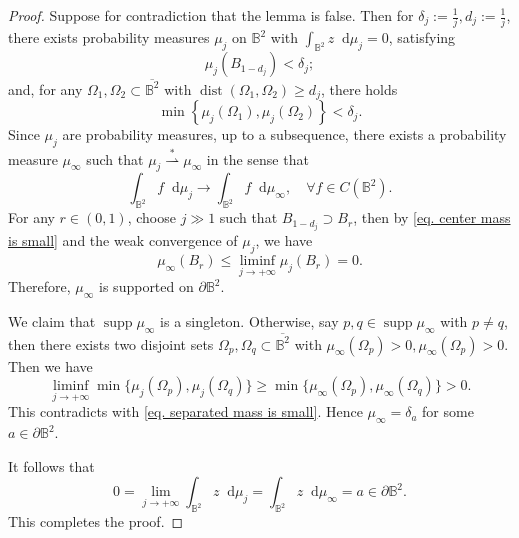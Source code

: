\documentclass[11pt,a4paper,twoside]{amsart}
\newtheorem{sketch proof}{Sketch of the proof}[section]
\newcommand{\dd}{\mathop{}\!\mathrm{d}}
\begin{document}
    \begin{proof}
        Suppose for contradiction that the lemma is false. Then for $\delta_j:=\frac{1}{j}, d_j:=\frac{1}{j}$, there exists probability measures $\mu_j$ on $\mathbb{B}^2$ with $\int_{\mathbb{B}^2}z\dd \mu_j=0$,  satisfying
        \begin{equation}\label{eq. center mass is small}
            \mu_j(B_{1-d_j})
        <\delta_j;
        \end{equation}
        and, for any $\Omega_1,\Omega_2\subset\overline{\mathbb{B}^2}$ with $\operatorname{dist}(\Omega_1,\Omega_2)\geq d_j$, there holds
        \begin{equation}\label{eq. separated mass is small}
            \min\left\{
            \mu_j(\Omega_1),\mu_j(\Omega_2)
        \right\}<\delta_j.
        \end{equation}
        Since $\mu_j$ are probability measures, up to a subsequence, there exists a probability measure $\mu_\infty$ such that $\mu_j\overset{*}{\rightharpoonup}\mu_\infty$ in the sense that
        \[
        \int_{\mathbb{B}^2}f\dd \mu_j
        \to 
        \int_{\mathbb{B}^2}f\dd \mu_\infty,\quad 
        \forall f\in C(\mathbb{B}^2).
        \]
        For any $r\in(0,1)$, choose $j\gg 1$ such that $B_{1-d_j}\supset B_r$, then by \cref{eq. center mass is small} and the weak convergence of $\mu_j$, we have
        \[
        \mu_\infty(B_r)
        \leq\liminf_{j\to+\infty}
        \mu_j(B_r)=0.
        \]
        Therefore, $\mu_\infty$ is supported on $\partial\mathbb{B}^2$. 

        We claim that $\operatorname{supp}\mu_\infty$ is a singleton. Otherwise, say $p,q\in\operatorname{supp}\mu_\infty$ with $p\not=q$, then there exists two disjoint sets $\Omega_p,\Omega_q\subset\overline{\mathbb{B}^2}$ with $\mu_\infty(\Omega_p)>0,\mu_\infty(\Omega_p)>0$. Then we have
        \[
        \liminf_{j\to+\infty}
        \min\{\mu_j(\Omega_p),\mu_j(\Omega_q)\}
        \geq 
        \min\{\mu_\infty(\Omega_p),\mu_\infty(\Omega_q)\}
        >0.
        \]
        This contradicts with \cref{eq. separated mass is small}. Hence $\mu_\infty=\delta_a$ for some $a\in\partial\mathbb{B}^2$.
        
        It follows that
        \[
        0=\lim_{j\to+\infty}\int_{\mathbb{B}^2}
        z\dd \mu_j
        =\int_{\mathbb{B}^2}z\dd \mu_\infty
        =a\in\partial\mathbb{B}^2.
        \]
        This completes the proof.
    \end{proof}
\end{document}
